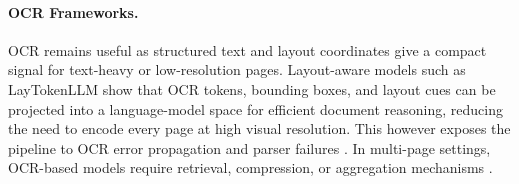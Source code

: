 \documentclass[11pt]{article}
\begin{document}
\paragraph{OCR Frameworks.}
OCR remains useful as structured text and layout coordinates give a compact signal for text-heavy or low-resolution pages. Layout-aware models such as LayTokenLLM \cite{zhu2025simple} show that OCR tokens, bounding boxes, and layout cues can be projected into a language-model space for efficient document reasoning, reducing the need to encode every page at high visual resolution. This however exposes the pipeline to OCR error propagation and parser failures \cite{liao2025doclayllm}. In multi-page settings, OCR-based models require retrieval, compression, or aggregation mechanisms \cite{hannan2025docslm, zhang2024cream}.

\end{document}
